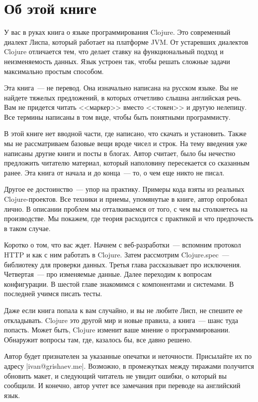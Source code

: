 \chapter*{Об этой книге}

У вас в руках книга о языке программирования Clojure. Это современный диалект
Лиспа, который работает на платформе JVM. От устаревших диалектов Clojure
отличается тем, что делает ставку на функциональный подход и неизменяемость
данных. Язык устроен так, чтобы решать сложные задачи максимально простым
способом.

Эта книга~--- не перевод. Она изначально написана на русском языке. Вы не
найдете тяжелых предложений, в которых отчетливо слышна английская речь. Вам не
придется читать <<маркер>> вместо <<токен>> и другую нелепицу. Все термины написаны
в том виде, чтобы быть понятными программисту.

В этой книге нет вводной части, где написано, что скачать и установить. Также мы
не рассматриваем базовые вещи вроде чисел и строк. На тему введения уже написаны
другие книги и посты в блогах. Автор считает, было бы нечестно предложить
читателю материал, который наполовину пересекается со сказанным ранее. Эта книга
от начала и до конца~--- то, о чем еще никто не писал.

Другое ее достоинство~--- упор на практику. Примеры кода взяты из реальных
Clojure-проектов. Все техники и приемы, упомянутые в книге, автор опробовал
лично. В описании проблем мы отталкиваемся от того, с чем вы столкнетесь на
производстве. Мы покажем, где теория расходится с практикой и что предпочесть в
таком случае.

Коротко о том, что вас ждет. Начнем с веб-разработки~--- вспомним протокол HTTP
и как с ним работать в Clojure. Затем рассмотрим Clojure.spec~--- библиотеку для
проверки данных. Третья глава рассказывает про исключения. Четвертая~--- про
изменяемые данные. Далее переходим к вопросам конфигурации. В шестой главе
знакомимся с компонентами и системами. В последней учимся писать тесты.

Даже если книга попала к вам случайно, и вы не любите Лисп, не спешите ее
откладывать. Clojure это другой мир и новые правила, а книга~--- шанс туда
попасть. Может быть, Clojure изменит ваше мнение о программировании. Обнаружит
вопросы там, где, казалось бы, все давно решено.

Автор будет признателен за указанные опечатки и неточности. Присылайте их по
адресу \spverb|ivan@grishaev.me|. Возможно, в промежутках между тиражами
получится обновить макет, и следующий читатель не увидит ошибки, о который вы
сообщили. И конечно, автор учтет все замечания при переводе на английский язык.

